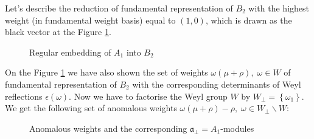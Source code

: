 \documentclass[a4paper,12pt]{article}
\theoremstyle{definition} \newtheorem{Def}{Definition}
\begin{document}
Let's describe the reduction of fundamental representation of $B_2$ with the highest weight (in fundamental weight basis) equal to $(1,0)$, which is drawn as the black vector at the Figure \ref{fig:B2_A1}.
\begin{figure}[ph]
  \noindent{}
  \caption{Regular embedding of $A_1$ into $B_2$}
  \label{fig:B2_A1}
\end{figure}
On the Figure \ref{fig:B2_A1} we have also shown the set of weights $\omega(\mu+\rho),\; \omega\in W$ of fundamental representation of $B_2$ with the corresponding determinants of Weyl reflections $\epsilon(\omega)$.
Now we have to factorise the Weyl group $W$ by $W_{\bot}=\left\{\omega_1\right\}$. We get the following set of anomalous weights $\omega(\mu+\rho)-\rho,\; \omega\in W_{\bot}\backslash W$:
\begin{figure}[ph]
  \noindent{}
  \caption{Anomalous weights and the corresponding $\mathfrak{a}_{\bot}=A_1$-modules}
  \label{fig:B2_A1_2}
\end{figure}
\end{document}
